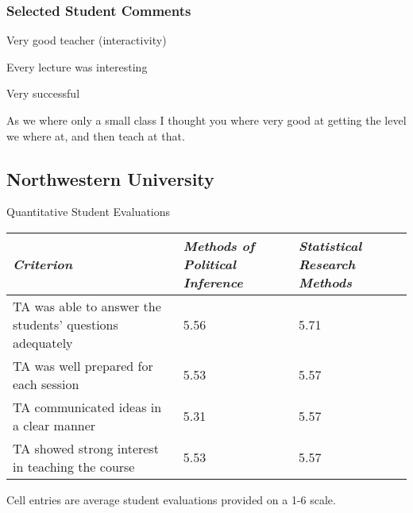 \documentclass[12pt]{article}
\begin{document}
\subsubsection*{Selected Student Comments}
\begin{itemize*}
	\item Very good teacher (interactivity)
	\item Every lecture was interesting
	\item Very successful
	\item As we where only a small class I thought you where very good at getting the level we where at, and then teach at that. 
	
\end{itemize*}			


\subsection{Northwestern University}

\begin{center}
Quantitative Student Evaluations 
\begin{tabular}{p{3.25in} p{1.25in} p{1.25in}}\toprule
\emph{Criterion}	
&\emph{Methods of Political Inference}	
&\emph{Statistical Research Methods}\\ \midrule
TA was able to answer the students' questions adequately 	&5.56	&5.71\\
TA was well prepared for each session 					&5.53	&5.57\\
TA communicated ideas in a clear manner 				&5.31	& 5.57\\
TA showed strong interest in teaching the course 			&5.53	&5.57\\
\bottomrule
\end{tabular}
\end{center}
Cell entries are average student evaluations provided on a 1-6 scale.
\end{document}

